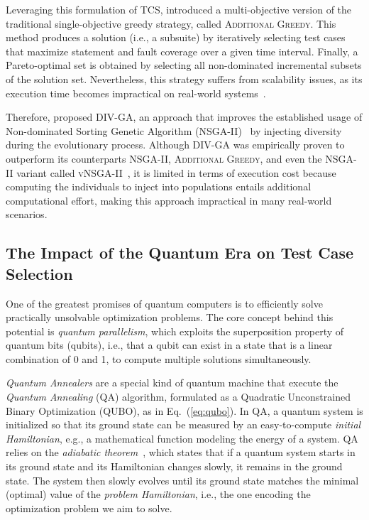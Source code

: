 Leveraging this formulation of TCS, \citet{yoo2007pareto} introduced a multi-objective version of the traditional single-objective greedy strategy, called \textsc{Additional Greedy}. This method produces a solution (i.e., a subsuite) by iteratively selecting test cases that maximize statement and fault coverage over a given time interval. Finally, a Pareto-optimal set is obtained by selecting all non-dominated incremental subsets of the solution set. Nevertheless, this strategy suffers from scalability issues, as its execution time becomes impractical on real-world systems~\citep{greedy_cmplx}.

Therefore, \citet{panichella2014improving} proposed \textsc{DIV-GA}, an approach that improves the established usage of Non-dominated Sorting Genetic Algorithm (\textsc{NSGA-II})~\citep{deb2000nsgaii} by injecting diversity during the evolutionary process. Although \textsc{DIV-GA} was empirically proven to outperform its counterparts \textsc{NSGA-II}, \textsc{Additional Greedy}, and even the \textsc{NSGA-II} variant called \textsc{vNSGA-II}~\citep{yoo2007pareto}, it is limited in terms of execution cost because computing the individuals to inject into populations entails additional computational effort, making this approach impractical in many real-world scenarios.

\subsection{The Impact of the Quantum Era on Test Case Selection}
\label{sec2.2:quantum}

One of the greatest promises of quantum computers is to efficiently solve practically unsolvable optimization problems. The core concept behind this potential is \textit{quantum parallelism}, which exploits the superposition property of quantum bits (qubits), i.e., that a qubit can exist in a state that is a linear combination of 0 and 1, to compute multiple solutions simultaneously.

\textit{Quantum Annealers} are a special kind of quantum machine that execute the \textit{Quantum Annealing} (QA) algorithm, formulated as a Quadratic Unconstrained Binary Optimization (QUBO), as in Eq.~(\ref{eq:qubo}). In QA, a quantum system is initialized so that its ground state can be measured by an easy-to-compute \textit{initial Hamiltonian}, e.g., a mathematical function modeling the energy of a system. QA relies on the \textit{adiabatic theorem}~\citep{kadowaki1998quantum,suzuki2009comparison}, which states that if a quantum system starts in its ground state and its Hamiltonian changes slowly, it remains in the ground state. The system then slowly evolves until its ground state matches the minimal (optimal) value of the \textit{problem Hamiltonian}, i.e., the one encoding the optimization problem we aim to solve.

